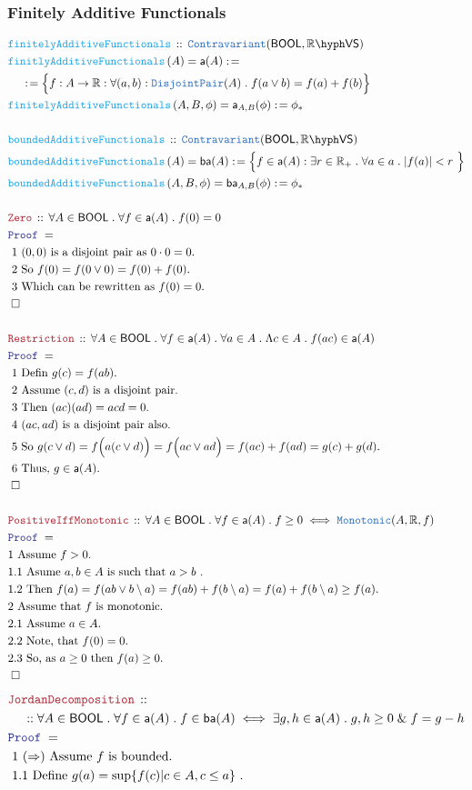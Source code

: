 \documentclass[12pt]{scrartcl}
\newcommand{\TYPE}[1]{\textcolor{NavyBlue}{\mathtt{#1}}}
\newcommand{\FUNC}[1]{\textcolor{Cerulean}{\mathtt{#1}}}
\newcommand{\LOGIC}[1]{\textcolor{Blue}{\mathtt{#1}}}
\newcommand{\THM}[1]{\textcolor{Maroon}{\mathtt{#1}}}
\renewcommand{\.}{\; . \;}
\newcommand{\de}{: \kern 0.1pc =}
\newcommand{\Act}[1]{\left( #1 \right)}
\newcommand{\Theorem}[2]{& \THM{#1} \, :: \, #2 \\ & \Proof = \\ }
\newcommand{\DeclareFunc}[2]{& \FUNC{#1} \, :: \, #2 \\}
\newcommand{\DefineNamedFunc}[4]{&  \FUNC{#1}\Act{#2} = #3 \de #4 \\}
\newcommand{\NewLine}{\\ & \kern 1pc}
\newcommand{\Page}[1]{ \begin{align*} #1 \end{align*}   }
\renewcommand{\And}{\; \& \;}
\newcommand{\Reals}{\mathbb{R} }
\newcommand{\QED}{\; \square}
\newcommand{\EndProof}{& \QED \\}
\newcommand{\Proof}{\LOGIC{Proof} \; }
\newcommand{\Explain}[1]{& \text{#1.} \\}
\newcommand{\Contra}{\TYPE{Contravariant}}
\newcommand{\BOOL}{\mathsf{BOOL}}
\newcommand{\VS}[1]{#1\hyph\mathsf{VS}} %
\newcommand{\af}{\mathsf{a}}
\newcommand{\baf}{\mathsf{ba}}
\begin{document}
\subsubsection{Finitely Additive Functionals}
\Page{
	\DeclareFunc{finitelyAdditiveFunctionals}
	{
		\Contra(\BOOL,\VS{\Reals})
	}
	\DefineNamedFunc{finitlyAdditiveFunctionals}{A}{\af(A)}
	{
		\NewLine \de	    
	    \Big\{ f : A \to \Reals : \forall (a,b) : \TYPE{DisjointPair}(A) \. f(a \vee b) = f(a) + f(b) \Big\}	
	}
	\DefineNamedFunc{finitelyAdditiveFunctionals}{A,B,\phi}{\af_{A,B}(\phi)}
	{
		\phi_*
	}
	\\
	\DeclareFunc{boundedAdditiveFunctionals}
	{
		\Contra(\BOOL,\VS{\Reals})
	}
	\DefineNamedFunc{boundedAdditiveFunctionals}{A}{\baf(A)}
	{	    
	    \Big\{ f \in \af(A) : \exists r \in \Reals_+ \. \forall a \in a \. |f(a)| < r  \ \Big\}	
	}
	\DefineNamedFunc{boundedAdditiveFunctionals}{A,B,\phi}{\baf_{A,B}(\phi)}
	{
		\phi_*
	}
	\\
	\Theorem{Zero}
	{
		\forall A \in \BOOL \.
		\forall f \in \af(A) \.
		f(0) = 0
	}
	\Explain{ 1 $(0,0)$ is a disjoint pair as $0 \cdot 0 = 0$}
	\Explain{ 2 So $f(0) = f(0 \vee 0) = f(0) + f(0)$}
	\Explain{ 3 Which can be rewritten as $f(0) = 0$}
	\EndProof		
	\\
	\Theorem{Restriction}
	{
		\forall A \in \BOOL \.
		\forall f \in \af(A) \.
		\forall a \in A \.
		\Lambda c \in A \. f(ac)  \in \af(A)
	}
	\Explain{ 1 Defin $g(c) = f(ab)$}
	\Explain{ 2 Assume $(c,d)$ is a disjoint pair}
	\Explain{ 3 Then $(ac)(ad) = acd = 0$}
	\Explain{ 4 $(ac,ad)$ is a disjoint pair also}	
	\Explain{ 5 So $g(c \vee d) = f\Big(a(c \vee d)\Big) = f\Big(ac \vee ad\Big) =
		f(ac) + f(ad) = g(c) + g(d)$}
	\Explain{ 6 Thus, $g \in \af(A)$}
	\EndProof		
	\\
	\Theorem{PositiveIffMonotonic}
	{
		\forall A \in \BOOL \.
		\forall f \in \af(A) \.
		f \ge 0 \iff \TYPE{Monotonic}(A,\Reals,f)
	}
	\Explain{1 Assume $f > 0$}
	\Explain{1.1 Asume $a,b \in A$ is such that $a > b$ }
	\Explain{1.2 Then $f(a) = f(ab \vee b \setminus a) = f(ab) + f(b \setminus a) = 
		f(a) + f(b \setminus a) \ge f(a)$}
	\Explain{2 Assume that $f$ is monotonic}
	\Explain{2.1 Assume $a \in A$}
	\Explain{2.2 Note, that $f(0) = 0$}
	\Explain{2.3 So, as $a \ge 0$ then $f(a) \ge 0$}
	\EndProof
}\Page{
	\Theorem{JordanDecomposition}
	{
		\NewLine ::		
		\forall A \in \BOOL \.
		\forall f \in \af(A) \.
		f \in \baf(A) \iff 
		\exists g,h \in \af(A) \.		g,h \ge 0 \And f = g - h
	}
	\Explain{ 1 ($\Rightarrow$) Assume $f$ is bounded}
	\Explain{ 1.1 Define $g(a) = \sup \{ f(c) | c \in A, c \le a   \} $ }
}
\end{document}
